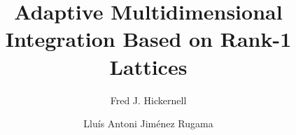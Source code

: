 \documentclass[graybox,footinfo]{svmult}
\newcommand{\N}{\mathbb{N}} %
\newcommand{\bsz}{\boldsymbol{z}}    %
\begin{document}
\newcommand{\bsa}{\boldsymbol{a}}    %
\newcommand{\bsh}{\boldsymbol{h}}    %
\newcommand{\bsi}{\boldsymbol{i}}    %
\newcommand{\bsj}{\boldsymbol{j}}    %
\newcommand{\bsk}{\boldsymbol{k}}    %
\newcommand{\bsl}{\boldsymbol{l}}    %
\newcommand{\bsr}{\boldsymbol{r}}    %
\newcommand{\bsnu}{\boldsymbol{\nu}}    %
\newcommand{\dif}{{\rm d}}			%
\newcommand{\me}{\text{e}}			%
\newcommand{\cc}{\mathcal{C}}
\newcommand{\cm}{\mathcal{M}}		%
\newcommand{\cl}{\mathcal{L}}
\newcommand{\cn}{\mathcal{N}}
\newcommand{\Order}{\mathcal{O}}
\newcommand{\cp}{\mathcal{P}}
\newcommand{\cx}{\mathcal{X}}
\newcommand{\natm}{\N_{0,m}}
\newcommand{\cube}{[0,1)^d}
\newcommand{\hf}{\hat{f}}
\newcommand{\rf}{\mathring{f}}
\newcommand{\tf}{\tilde{f}}
\newcommand{\hg}{\hat{g}}
\newcommand{\hI}{\hat{I}}
\newcommand{\tvk}{\tilde{\bsk}}
\newcommand{\hS}{\widehat{S}}
\newcommand{\tS}{\widetilde{S}}
\newcommand{\wcS}{\widecheck{S}}
\newcommand{\rnu}{\mathring{\nu}}
\newcommand{\tnu}{\widetilde{\nu}}
\newcommand{\hnu}{\widehat{\nu}}
\newcommand{\hbsnu}{\widehat{\bsnu}}   %
\newcommand{\homega}{\widehat{\omega}}
\newcommand{\wcomega}{\mathring{\omega}}
\newcommand{\fC}{\mathfrak{C}}
\newcommand{\nodes}{\{\bsz_i\}_{i=0}^{\infty}}
\newcommand{\nodesn}{\{\bsz_i\}_{i=0}^{n-1}}
\newcommand{\norm}[1]{\ensuremath{\left \lVert #1 \right \rVert}}
\newcommand{\abs}[1]{\ensuremath{\left |  #1 \right |}} %
\newcommand{\bigabs}[1]{\ensuremath{\bigl \lvert #1 \bigr \rvert}}
\newcommand{\Bigabs}[1]{\ensuremath{\Bigl \lvert #1 \Bigr \rvert}}
\newcommand{\biggabs}[1]{\ensuremath{\biggl \lvert #1 \biggr \rvert}}
\newcommand{\Biggabs}[1]{\ensuremath{\Biggl \lvert #1 \Biggr \rvert}}
\newcommand{\ip}[3][{}]{\ensuremath{\left \langle #2, #3 \right \rangle_{#1}}}



\title*{Adaptive Multidimensional Integration Based on Rank-1 Lattices}
\author{Fred J. Hickernell \and Llu\'is Antoni Jim\'enez Rugama}
\maketitle

\abstract{}
\end{document}
